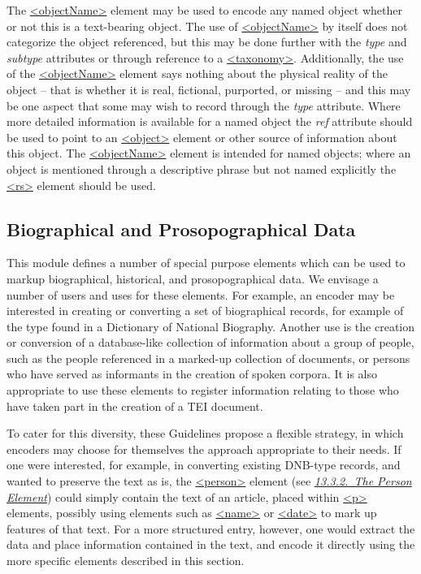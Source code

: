 The \hyperref[TEI.objectName]{<objectName>} element may be used to encode any named object whether or not this is a text-bearing object. The use of \hyperref[TEI.objectName]{<objectName>} by itself does not categorize the object referenced, but this may be done further with the {\itshape type} and {\itshape subtype} attributes or through reference to a \hyperref[TEI.taxonomy]{<taxonomy>}. Additionally, the use of the \hyperref[TEI.objectName]{<objectName>} element says nothing about the physical reality of the object – that is whether it is real, fictional, purported, or missing – and this may be one aspect that some may wish to record through the {\itshape type} attribute. Where more detailed information is available for a named object the {\itshape ref} attribute should be used to point to an \hyperref[TEI.object]{<object>} element or other source of information about this object. The \hyperref[TEI.objectName]{<objectName>} element is intended for named objects; where an object is mentioned through a descriptive phrase but not named explicitly the \hyperref[TEI.rs]{<rs>} element should be used.
\subsection[{Biographical and Prosopographical Data}]{Biographical and Prosopographical Data}\label{NDPERS}\par
This module defines a number of special purpose elements which can be used to markup biographical, historical, and prosopographical data. We envisage a number of users and uses for these elements. For example, an encoder may be interested in creating or converting a set of biographical records, for example of the type found in a Dictionary of National Biography. Another use is the creation or conversion of a database-like collection of information about a group of people, such as the people referenced in a marked-up collection of documents, or persons who have served as informants in the creation of spoken corpora. It is also appropriate to use these elements to register information relating to those who have taken part in the creation of a TEI document.\par
To cater for this diversity, these Guidelines propose a flexible strategy, in which encoders may choose for themselves the approach appropriate to their needs. If one were interested, for example, in converting existing DNB-type records, and wanted to preserve the text as is, the \hyperref[TEI.person]{<person>} element (see \textit{\hyperref[NDPERSE]{13.3.2.\ The Person Element}}) could simply contain the text of an article, placed within \hyperref[TEI.p]{<p>} elements, possibly using elements such as \hyperref[TEI.name]{<name>} or \hyperref[TEI.date]{<date>} to mark up features of that text. For a more structured entry, however, one would extract the data and place information contained in the text, and encode it directly using the more specific elements described in this section.
